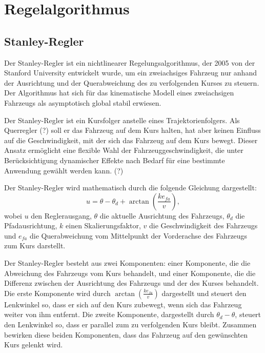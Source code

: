 \documentclass[arbeit=studie,oneside,BCOR=12mm]{ArbeitRST}
\begin{document}
\chapter{Regelalgorithmus}

\section{Stanley-Regler}


Der Stanley-Regler ist ein nichtlinearer Regelungsalgorithmus, der 2005 von
der Stanford University entwickelt wurde, um ein zweiachsiges Fahrzeug nur
anhand der Ausrichtung und der Querabweichung des zu verfolgenden Kurses zu
steuern. Der Algorithmus hat sich für das kinematische Modell eines
zweiachsigen Fahrzeugs als asymptotisch global stabil erwiesen.

Der Stanley-Regler ist ein Kursfolger anstelle eines Trajektorienfolgers. Als
Querregler (?) soll er das Fahrzeug auf dem Kurs halten, hat aber keinen
Einfluss auf die Geschwindigkeit, mit der sich das Fahrzeug auf dem Kurs
bewegt. Dieser Ansatz ermöglicht eine flexible Wahl der
Fahrzeuggeschwindigkeit, die unter Berücksichtigung dynamischer Effekte nach
Bedarf für eine bestimmte Anwendung gewählt werden kann. (?)

Der Stanley-Regler wird mathematisch durch die folgende Gleichung dargestellt:
\begin{equation} 
  u = \theta - \theta_d + \arctan\left(\frac{ke_{fa}}{v}\right),
  \label{eq:Stanley-Regler} 
\end{equation}
wobei $u$ den Reglerausgang, $\theta$ die aktuelle Ausrichtung des Fahrzeugs,
$\theta_d$ die Pfadausrichtung, $k$ einen Skalierungsfaktor, $v$ die
Geschwindigkeit des Fahrzeugs und $e_{fa}$ die Querabweichung vom Mittelpunkt
der Vorderachse des Fahrzeugs zum Kurs darstellt.

Der Stanley-Regler besteht aus zwei Komponenten: einer Komponente, die die
Abweichung des Fahrzeugs vom Kurs behandelt, und einer Komponente, die die
Differenz zwischen der Ausrichtung des Fahrzeugs und der des Kurses behandelt.
Die erste Komponente wird durch $\arctan(\frac{ke_{fa}}{v})$ dargestellt und
steuert den Lenkwinkel so, dass er sich auf den Kurs zubewegt, wenn sich das
Fahrzeug weiter von ihm entfernt. Die zweite Komponente, dargestellt durch
$\theta_d - \theta$, steuert den Lenkwinkel so, dass er parallel zum zu
verfolgenden Kurs bleibt. Zusammen bewirken diese beiden Komponenten, dass das
Fahrzeug auf den gewünschten Kurs gelenkt wird.
\end{document}
